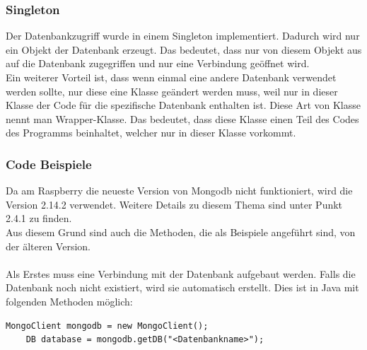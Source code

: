 \subsubsection{Singleton}
Der Datenbankzugriff wurde in einem Singleton implementiert. Dadurch wird nur ein Objekt der Datenbank erzeugt. Das bedeutet, dass nur von diesem Objekt aus auf die Datenbank zugegriffen und nur eine Verbindung geöffnet wird.
\\ Ein weiterer Vorteil ist, dass wenn einmal eine andere Datenbank verwendet werden sollte, nur diese eine Klasse geändert werden muss, weil nur in dieser Klasse der Code für die spezifische Datenbank enthalten ist. Diese Art von Klasse nennt man Wrapper-Klasse. Das bedeutet, dass diese Klasse einen Teil des Codes des Programms beinhaltet, welcher nur in dieser Klasse vorkommt.

\subsubsection{Code Beispiele}
Da am Raspberry die neueste Version von Mongodb nicht funktioniert, wird die Version 2.14.2 verwendet. Weitere Details zu diesem Thema sind unter Punkt 2.4.1 zu finden.
\\ Aus diesem Grund sind auch die Methoden, die als Beispiele angeführt sind, von der älteren Version. 
\\ \\ 
Als Erstes muss eine Verbindung mit der Datenbank aufgebaut werden. Falls die Datenbank noch nicht existiert, wird sie automatisch erstellt.
Dies ist in Java mit folgenden Methoden möglich:
\begin{lstlisting}[style=JavaStyle, caption=Mit Mongodb verbinden]
	MongoClient mongodb = new MongoClient();
	DB database = mongodb.getDB("<Datenbankname>");
\end{lstlisting}


